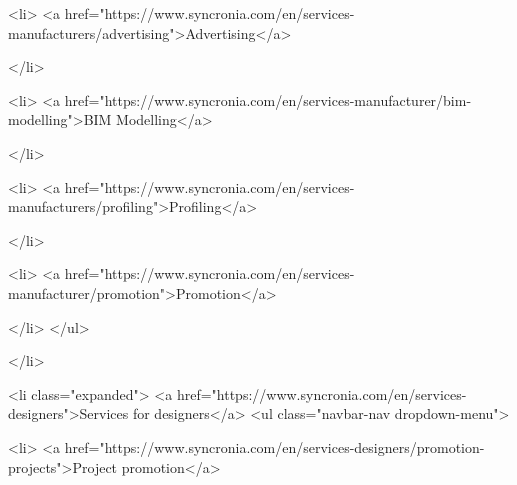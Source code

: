                   
            
      
            
    

                    <li>
                  <a href="https://www.syncronia.com/en/services-manufacturers/advertising">Advertising</a>
                    
            </li>
        
                   
            
      
            
    

                    <li>
                  <a href="https://www.syncronia.com/en/services-manufacturer/bim-modelling">BIM Modelling</a>
                    
            </li>
        
                   
            
      
            
    

                    <li>
                  <a href="https://www.syncronia.com/en/services-manufacturers/profiling">Profiling</a>
                    
            </li>
        
                   
            
      
            
    

                    <li>
                  <a href="https://www.syncronia.com/en/services-manufacturer/promotion">Promotion</a>
                    
            </li>
        </ul>
  
      
            </li>
        
                   
            
      
            
    

                    <li class="expanded">
                  <a href="https://www.syncronia.com/en/services-designers">Services for designers</a>
                                          <ul class="navbar-nav dropdown-menu">
            
                   
            
      
            
    

                    <li>
                  <a href="https://www.syncronia.com/en/services-designers/promotion-projects">Project promotion</a>
                    
